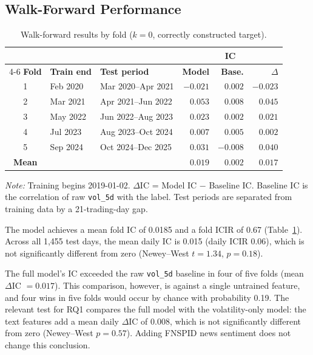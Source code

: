 \documentclass[10pt,letterpaper,twocolumn]{article}
\begin{document}
\subsection{Walk-Forward Performance}

\begin{table}[t]
\centering\footnotesize\setlength{\tabcolsep}{2.5pt}
\caption{Walk-forward results by fold ($k = 0$, correctly constructed target).}
\label{tab:folds}
\begin{tabular}{@{}c l l r r r@{}}
\toprule
& & & \multicolumn{3}{c}{\textbf{IC}} \\
\cmidrule(l){4-6}
\textbf{Fold} & \textbf{Train end} & \textbf{Test period} & \textbf{Model} & \textbf{Base.} & \textbf{$\Delta$} \\
\midrule
1 & Feb 2020 & Mar 2020--Apr 2021 & $-0.021$ & $0.002$ & $-0.023$ \\
2 & Mar 2021 & Apr 2021--Jun 2022 & $0.053$ & $0.008$ & $0.045$  \\
3 & May 2022 & Jun 2022--Aug 2023 & $0.023$ & $0.002$ & $0.021$  \\
4 & Jul 2023 & Aug 2023--Oct 2024 & $0.007$ & $0.005$ & $0.002$  \\
5 & Sep 2024 & Oct 2024--Dec 2025 & $0.031$ & $-0.008$ & $0.040$  \\
\midrule
\textbf{Mean} & & & $0.019$ & $0.002$ & $0.017$  \\
\bottomrule
\end{tabular}
\par\smallskip
{\scriptsize \textit{Note:} Training begins 2019-01-02. $\Delta$IC = Model IC $-$ Baseline IC. Baseline IC is the correlation of raw \texttt{vol\_5d} with the label. Test periods are separated from training data by a 21-trading-day gap.}
\end{table}

The model achieves a mean fold IC of 0.0185 and a fold ICIR of 0.67 (Table~\ref{tab:folds}). Across all 1,455 test days, the mean daily IC is 0.015 (daily ICIR 0.06), which is not significantly different from zero (Newey--West $t = 1.34$, $p = 0.18$).

The full model's IC exceeded the raw \texttt{vol\_5d} baseline in four of five folds (mean $\Delta$IC $= 0.017$). This comparison, however, is against a single untrained feature, and four wins in five folds would occur by chance with probability 0.19. The relevant test for RQ1 compares the full model with the volatility-only model: the text features add a mean daily $\Delta$IC of 0.008, which is not significantly different from zero (Newey--West $p = 0.57$). Adding FNSPID news sentiment does not change this conclusion.
\end{document}
